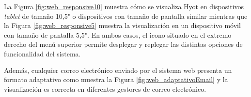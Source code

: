 \documentclass[12pt,a4paper, twoside]{report}
\begin{document}
	La Figura \ref{fig:web_responsive10} muestra cómo se visualiza Hyot en dispositivos \textit{tablet} de tamaño 10,5" o dispositivos con tamaño de pantalla similar mientras que la Figura \ref{fig:web_responsive5} muestra la visualización en un dispositivo móvil con tamaño de pantalla 5,5". En ambos casos, el icono situado en el extremo derecho del menú superior permite desplegar y replegar las distintas opciones de funcionalidad del sistema.

	
	
	Además, cualquier correo electrónico enviado por el sistema web presenta un formato adaptativo como muestra la Figura \ref{fig:web_adaptativoEmail} y la visualización es correcta en diferentes gestores de correo electrónico.
	
	
\end{document}
